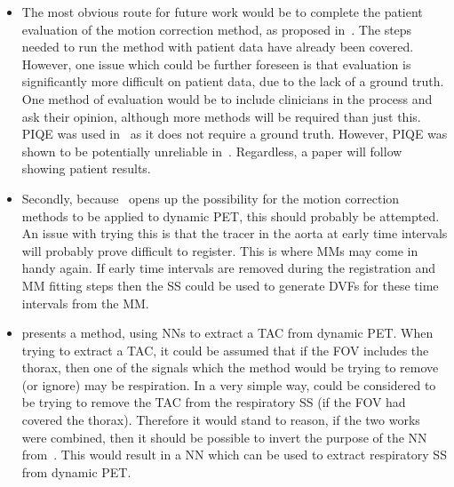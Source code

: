         \begin{itemize}
            \item The most obvious route for future work would be to complete the patient evaluation of the motion correction method, as proposed in~. The steps needed to run the method with patient data have already been covered. However, one issue which could be further foreseen is that evaluation is significantly more difficult on patient data, due to the lack of a ground truth. One method of evaluation would be to include clinicians in the process and ask their opinion, although more methods will be required than just this. \gls{PIQE} was used in~ as it does not require a ground truth. However, \gls{PIQE} was shown to be potentially unreliable in~. Regardless, a paper will follow showing patient results.

            \item Secondly, because~ opens up the possibility for the motion correction methods to be applied to dynamic \gls{PET}, this should probably be attempted. An issue with trying this is that the tracer in the aorta at early time intervals will probably prove difficult to register. This is where \glspl{MM} may come in handy again. If early time intervals are removed during the registration and \gls{MM} fitting steps then the \gls{SS} could be used to generate \glspl{DVF} for these time intervals from the \gls{MM}.

            \item {} presents a method, using \glspl{NN} to extract a \gls{TAC} from dynamic \gls{PET}. When trying to extract a \gls{TAC}, it could be assumed that if the \gls{FOV} includes the thorax, then one of the signals which the method would be trying to remove (or ignore) may be respiration. In a very simple way,  could be considered to be trying to remove the \gls{TAC} from the respiratory \gls{SS} (if the \gls{FOV} had covered the thorax). Therefore it would stand to reason, if the two works were combined, then it should be possible to invert the purpose of the \gls{NN} from~. This would result in a \gls{NN} which can be used to extract respiratory \gls{SS} from dynamic \gls{PET}.


\end{itemize}

